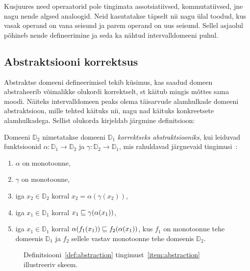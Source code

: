 \documentclass[../thesis.tex]{subfiles}
\begin{document}
Kusjuures need operaatorid pole tingimata assotsiatiivsed, kommutatiivsed, jne nagu nende algsed analoogid. Neid kasutatakse täpselt nii nagu ülal toodud, kus vasak operand on vana seisund ja parem operand on uus seisund. Sellel asjaolul põhineb nende defineerimine ja seda ka nähtud intervalldomeeni puhul.

\subsection{Abstraktsiooni korrektsus}
\label{sec:abstraction-props}
Abstraktse domeeni defineerimisel tekib küsimus, kas saadud domeen abstraheerib võimalikke olukordi korrektselt, st käitub mingis mõttes sama moodi. Näiteks intervalldomeen peaks olema täisarvude alamhulkade domeeni abstraktsioon, mille tehted käituks nii, nagu nad käituks konkreetsete alamhulkadega. Sellist olukorda kirjeldab järgmine definitsioon:
\begin{definition}
\label{def:abstraction}
Domeeni $\mathbb{D}_2$ nimetatakse domeeni $\mathbb{D}_1$ \emph{korrektseks abstraktsiooniks}, kui leiduvad funktsioonid $\alpha: \mathbb{D}_1 \to \mathbb{D}_2$ ja $\gamma: \mathbb{D}_2 \to \mathbb{D}_1$, mis rahuldavad järgnevaid tingimusi~\cite[242]{cousot77}:
\begin{enumerate}[nosep]
	\item $\alpha$ on monotoonne, \label{item:alphamono}
	\item $\gamma$ on monotoonne,
	\item iga $x_2 \in \mathbb{D}_2$ korral $x_2 = \alpha (\gamma (x_2))$, \label{item:gamma}
	\item iga $x_1 \in \mathbb{D}_1$ korral $x_1 \sqsubseteq \gamma (\alpha (x_1))$, \label{item:alpha}
	\item iga $x_1 \in \mathbb{D}_1$ korral $\alpha (f_1 (x_1)) \sqsubseteq f_2 (\alpha (x_1))$, kus $f_1$ on monotoonne tehe domeenis $\mathbb{D}_1$ ja $f_2$ sellele vastav monotoonne tehe domeenis $\mathbb{D}_2$. \label{item:abstraction}
\end{enumerate}
\end{definition}

\begin{figure}
	\centering
	\caption{Definitsiooni~\ref{def:abstraction} tingimust~\ref{item:abstraction} illustreeriv skeem.}
	\label{fig:abstraction}
\end{figure}
\end{document}
